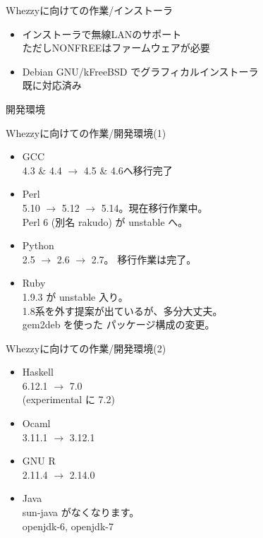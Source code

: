 \begin{frame}{Whezzyに向けての作業/インストーラ}
\begin{itemize}

\item インストーラで無線LANのサポート\\
ただしNONFREEはファームウェアが必要

\item Debian GNU/kFreeBSD でグラフィカルインストーラ\\
既に対応済み
\end{itemize}
\end{frame}


\begin{frame}
\begin{center}
\LARGE{開発環境}
\end{center}
\end{frame}

\begin{frame}{Whezzyに向けての作業/開発環境(1)}
\begin{itemize}
\item GCC \\
4.3 \& 4.4 $\rightarrow$ 4.5 \& 4.6へ移行完了
\item Perl\\
5.10 $\rightarrow$ 5.12 $\rightarrow$ 5.14。現在移行作業中。\\
Perl 6 (別名 rakudo) が unstable へ。
\item Python\\
2.5 $\rightarrow$ 2.6 $\rightarrow$ 2.7。 移行作業は完了。
\item Ruby\\
1.9.3 が unstable 入り。\\
1.8系を外す提案が出ているが、多分大丈夫。\\
gem2deb を使った パッケージ構成の変更。
\end{itemize}
\end{frame}  

\begin{frame}{Whezzyに向けての作業/開発環境(2)}
\begin{itemize}

\item Haskell\\
6.12.1 $\rightarrow$ 7.0 \\
(experimental に 7.2)

\item Ocaml\\
3.11.1 $\rightarrow$ 3.12.1

\item GNU R\\
2.11.4 $\rightarrow$ 2.14.0

\item Java\\
sun-java がなくなります。\\
openjdk-6, openjdk-7


\end{itemize}
\end{frame}

